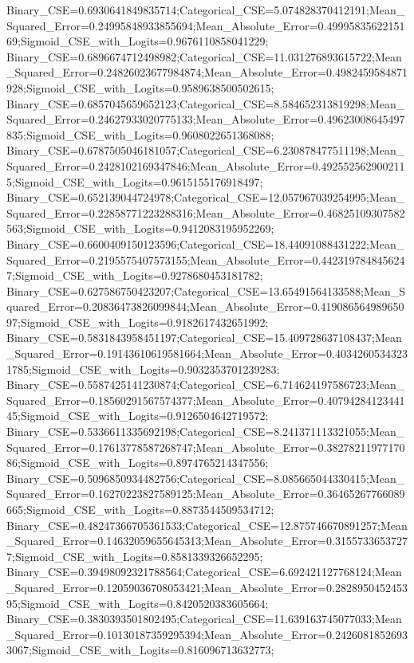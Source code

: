 Binary_CSE=0.6930641849835714;Categorical_CSE=5.074828370412191;Mean_Squared_Error=0.24995848933855694;Mean_Absolute_Error=0.4999583562215169;Sigmoid_CSE_with_Logits=0.9676110858041229;
Binary_CSE=0.6896674712498982;Categorical_CSE=11.031276893615722;Mean_Squared_Error=0.24826023677984874;Mean_Absolute_Error=0.4982459584871928;Sigmoid_CSE_with_Logits=0.9589638500502615;
Binary_CSE=0.6857045659652123;Categorical_CSE=8.584652313819298;Mean_Squared_Error=0.24627933020775133;Mean_Absolute_Error=0.49623008645497835;Sigmoid_CSE_with_Logits=0.9608022651368088;
Binary_CSE=0.6787505046181057;Categorical_CSE=6.230878477511198;Mean_Squared_Error=0.2428102169347846;Mean_Absolute_Error=0.4925525629002115;Sigmoid_CSE_with_Logits=0.9615155176918497;
Binary_CSE=0.652139044724978;Categorical_CSE=12.057967039254995;Mean_Squared_Error=0.22858771223288316;Mean_Absolute_Error=0.46825109307582563;Sigmoid_CSE_with_Logits=0.9412083195952269;
Binary_CSE=0.6600409150123596;Categorical_CSE=18.44091088431222;Mean_Squared_Error=0.2195575407573155;Mean_Absolute_Error=0.4423197848456247;Sigmoid_CSE_with_Logits=0.9278680453181782;
Binary_CSE=0.627586750423207;Categorical_CSE=13.65491564133588;Mean_Squared_Error=0.20836473826099844;Mean_Absolute_Error=0.41908656498965097;Sigmoid_CSE_with_Logits=0.9182617432651992;
Binary_CSE=0.5831843958451197;Categorical_CSE=15.409728637108437;Mean_Squared_Error=0.19143610619581664;Mean_Absolute_Error=0.40342605343231785;Sigmoid_CSE_with_Logits=0.9032353701239283;
Binary_CSE=0.5587425141230874;Categorical_CSE=6.714624197586723;Mean_Squared_Error=0.18560291567574377;Mean_Absolute_Error=0.4079428412344145;Sigmoid_CSE_with_Logits=0.9126504642719572;
Binary_CSE=0.5336611335692198;Categorical_CSE=8.241371113321055;Mean_Squared_Error=0.17613778587268747;Mean_Absolute_Error=0.3827821197717086;Sigmoid_CSE_with_Logits=0.8974765214347556;
Binary_CSE=0.5096850934482756;Categorical_CSE=8.085665044330415;Mean_Squared_Error=0.16270223827589125;Mean_Absolute_Error=0.36465267766089665;Sigmoid_CSE_with_Logits=0.8873544509534712;
Binary_CSE=0.48247366705361533;Categorical_CSE=12.875746670891257;Mean_Squared_Error=0.14632059655645313;Mean_Absolute_Error=0.31557336537277;Sigmoid_CSE_with_Logits=0.8581339326652295;
Binary_CSE=0.39498092321788564;Categorical_CSE=6.692421127768124;Mean_Squared_Error=0.12059036708053421;Mean_Absolute_Error=0.282895045245395;Sigmoid_CSE_with_Logits=0.8420520383605664;
Binary_CSE=0.3830393501802495;Categorical_CSE=11.639163745077033;Mean_Squared_Error=0.10130187359295394;Mean_Absolute_Error=0.24260818526933067;Sigmoid_CSE_with_Logits=0.816096713632773;
